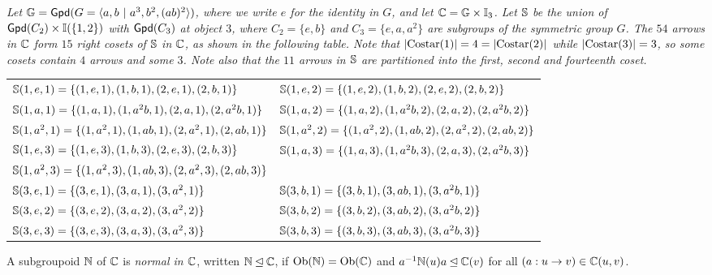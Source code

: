 \newpage
\begin{example}
\emph{Let $\mathbb{G} = {\sf Gpd}(G = \langle a,b ~|~a^3,b^2,(ab)^2 \rangle)$, 
where we write $e$ for the identity in $G$, 
and let $\mathbb{C} = \mathbb{G} \times \mathbb{I}_3$. 
Let $\mathbb{S}$ be the union of ${\sf Gpd}(C_2) \times \mathbb{I}(\{1,2\})$ 
with ${\sf Gpd}(C_3)$ at object $3$, where $C_2=\{e,b\}$ and $C_3=\{e,a,a^2\}$ 
are subgroups of the symmetric group $G$. 
The $54$ arrows in $\mathbb{C}$ form $15$ right cosets of $\mathbb{S}$ in $\mathbb{C}$, 
as shown in the following table. 
Note that $|\mathrm{Costar}(1)|=4=|\mathrm{Costar}(2)|$ while $|\mathrm{Costar}(3)|=3$, 
so some cosets contain $4$ arrows and some $3$. 
Note also that the $11$ arrows in $\mathbb{S}$ are partitioned into 
the first, second and fourteenth coset.} 
{\small 
\begin{center} 
\begin{tabular}{ll}
$\mathbb{S}(1,e,1) = \{(1,e,1),(1,b,1),(2,e,1),(2,b,1)\}$ 
  & $\mathbb{S}(1,e,2) = \{(1,e,2),(1,b,2),(2,e,2),(2,b,2)\}$ \\  
$\mathbb{S}(1,a,1) = \{(1,a,1),(1,a^2b,1),(2,a,1),(2,a^2b,1)\}$ 
  & $\mathbb{S}(1,a,2) = \{(1,a,2),(1,a^2b,2),(2,a,2),(2,a^2b,2)\}$ \\  
$\mathbb{S}(1,a^2,1) = \{(1,a^2,1),(1,ab,1),(2,a^2,1),(2,ab,1)\}$ 
  & $\mathbb{S}(1,a^2,2) = \{(1,a^2,2),(1,ab,2),(2,a^2,2),(2,ab,2)\}$ \\  
$\mathbb{S}(1,e,3) = \{(1,e,3),(1,b,3),(2,e,3),(2,b,3)\}$ 
  & $\mathbb{S}(1,a,3) = \{(1,a,3),(1,a^2b,3),(2,a,3),(2,a^2b,3)\}$ \\  
$\mathbb{S}(1,a^2,3) = \{(1,a^2,3),(1,ab,3),(2,a^2,3),(2,ab,3)\}$ 
  &  \\  
$\mathbb{S}(3,e,1) = \{(3,e,1),(3,a,1),(3,a^2,1)\}$ 
  & $\mathbb{S}(3,b,1) = \{(3,b,1),(3,ab,1),(3,a^2b,1)\}$ \\  
$\mathbb{S}(3,e,2) = \{(3,e,2),(3,a,2),(3,a^2,2)\}$ 
  & $\mathbb{S}(3,b,2) = \{(3,b,2),(3,ab,2),(3,a^2b,2)\}$ \\  
$\mathbb{S}(3,e,3) = \{(3,e,3),(3,a,3),(3,a^2,3)\}$ 
  & $\mathbb{S}(3,b,3) = \{(3,b,3),(3,ab,3),(3,a^2b,3)\}$ \\  
\end{tabular}
\end{center}}
\end{example}



A subgroupoid $\mathbb{N}$ of $\mathbb{C}$ is \emph{normal in $\mathbb{C}$}, 
written $\mathbb{N} \unlhd \mathbb{C}$, 
if $\mathrm{Ob}(\mathbb{N}) = \mathrm{Ob}(\mathbb{C})$ and $a^{-1}\mathbb{N}(u)a \unlhd \mathbb{C}(v)$ 
for all $(a : u \to v) \in \mathbb{C}(u,v)$. 

